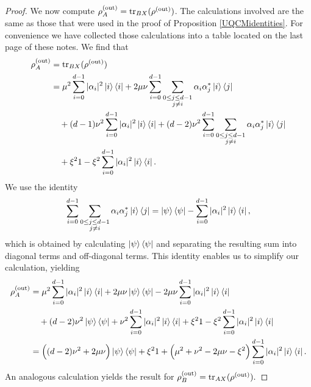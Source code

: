 \documentclass[reqno]{amsart}
\numberwithin{lemma}{section}
\numberwithin{proposition}{section}
\newcommand{\out}{\textnormal{out}}
\newcommand{\tr}{\textnormal{tr}}
\begin{document}
{\begin{proof}
We now compute $\rho_{A}^{(\out)} = \tr_{BX}(\rho^{(\out)})$. The calculations involved are the same as those that were used in the proof of Proposition \ref{UQCMidentities}. For convenience we have collected those calculations into a table located on the last page of these notes. We find that
\begin{align*}
\rho_{A}^{(\out)} &= \tr_{BX}(\rho^{(\out)})\\
&= \mu^{2} \sum_{i=0}^{d-1} \vert \alpha_{i} \vert^{2} \ket{i} \bra{i} + 2\mu \nu \sum_{i=0}^{d-1} \sum_{\substack{0 \leq j \leq d-1\\ j \neq i}} \alpha_{i} \alpha_{j}^{*} \ket{i} \bra{j}\\
& \quad + (d-1) \nu^{2} \sum_{i=0}^{d-1} \vert \alpha_{i} \vert^{2} \ket{i} \bra{i} + (d-2) \nu^{2} \sum_{i=0}^{d-1} \sum_{\substack{0 \leq j \leq d-1\\ j \neq i}} \alpha_{i} \alpha_{j}^{*} \ket{i} \bra{j}\\
& \quad + \xi^{2} 1 - \xi^{2} \sum_{i=0}^{d-1} \vert \alpha_{i} \vert^{2} \ket{i} \bra{i}.
\end{align*}
We use the identity
\begin{equation*}
\sum_{i=0}^{d-1} \sum_{\substack{0 \leq j \leq d-1\\ j \neq i}} \alpha_{i} \alpha_{j}^{*} \ket{i}\bra{j} = \ket{\psi} \bra{\psi} - \sum_{i=0}^{d-1} \vert \alpha_{i} \vert^{2} \ket{i} \bra{i},
\end{equation*}
which is obtained by calculating $\ket{\psi} \bra{\psi}$ and separating the resulting sum into diagonal terms and off-diagonal terms. This identity enables us to simplify our calculation, yielding
\begin{align*}
\rho_{A}^{(\out)} &= \mu^{2} \sum_{i=0}^{d-1} \vert \alpha_{i} \vert^{2} \ket{i} \bra{i} + 2\mu \nu \ket{\psi} \bra{\psi} - 2 \mu \nu \sum_{i=0}^{d-1} \vert \alpha_{i} \vert^{2} \ket{i} \bra{i}\\
&\quad + (d-2) \nu^{2} \ket{\psi} \bra{\psi} + \nu^{2} \sum_{i=0}^{d-1} \vert \alpha_{i} \vert^{2} \ket{i} \bra{i} + \xi^{2} 1 - \xi^{2} \sum_{i=0}^{d-1} \vert \alpha_{i} \vert^{2} \ket{i} \bra{i}\\
&= \Big ( (d-2) \nu^{2} + 2 \mu \nu \Big ) \ket{\psi} \bra{\psi} + \xi^{2} 1 + \Big ( \mu^{2} + \nu^{2} - 2 \mu \nu - \xi^{2} \Big ) \sum_{i=0}^{d-1} \vert \alpha_{i} \vert^{2} \ket{i} \bra{i}.
\end{align*}
An analogous calculation yields the result for $\rho_{B}^{(\out)} = \tr_{AX}(\rho^{(\out)}).$
\end{proof}

}
\end{document}
